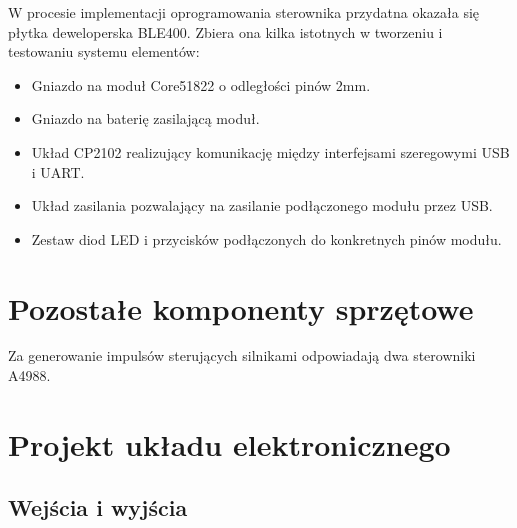 W procesie implementacji oprogramowania sterownika przydatna okazała się płytka
deweloperska BLE400. Zbiera ona kilka istotnych w tworzeniu i testowaniu systemu
elementów:

\begin{itemize}

\item Gniazdo na moduł Core51822 o odległości pinów 2mm.

\item Gniazdo na baterię zasilającą moduł.

\item Układ CP2102 realizujący komunikację między interfejsami szeregowymi USB
i UART.

\item Układ zasilania pozwalający na zasilanie podłączonego modułu przez USB.

\item Zestaw diod LED i przycisków podłączonych do konkretnych pinów modułu.

\end{itemize}

\section{Pozostałe komponenty sprzętowe}

Za generowanie impulsów sterujących silnikami odpowiadają dwa sterowniki A4988.

\section{Projekt układu elektronicznego}

\subsection{Wejścia i wyjścia}

